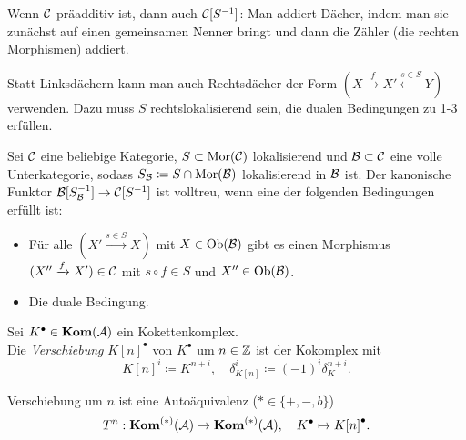 \documentclass{cheat-sheet}
\newcommand{\CCC}[1]{{#1}^{\bullet}} %
\begin{document}
\begin{bem}
  Wenn $\mathcal{C}$ präadditiv ist, dann auch $\mathcal{C}[S^{-1}]$: Man addiert Dächer, indem man sie zunächst auf einen gemeinsamen Nenner bringt und dann die Zähler (die rechten Morphismen) addiert.
\end{bem}

\begin{bem}
  Statt Linksdächern kann man auch Rechtsdächer der Form $(X \xrightarrow{f} X' \xleftarrow{s \in S} Y)$ verwenden. Dazu muss $S$ rechtslokalisierend sein, \dh{} die dualen Bedingungen zu 1-3 erfüllen.
\end{bem}

\begin{prop}
  Sei $\mathcal{C}$ eine beliebige Kategorie, $S \subset \operatorname{Mor}(\mathcal{C})$ lokalisierend und $\mathcal{B} \subset \mathcal{C}$ eine volle Unterkategorie, sodass $S_{\mathcal{B}} \coloneqq S \cap \operatorname{Mor}(\mathcal{B})$ lokalisierend in $\mathcal{B}$ ist.
  Der kanonische Funktor $\mathcal{B}[S_{\mathcal{B}}^{-1}] \to \mathcal{C}[S^{-1}]$ ist volltreu, wenn eine der folgenden Bedingungen erfüllt ist:
  \begin{itemize}
    \item Für alle $(X' \xrightarrow{s \in S} X)$ mit $X \in \operatorname{Ob}(\mathcal{B})$ gibt es einen Morphismus $(X'' \xrightarrow{f} X') \in \mathcal{C}$ mit $s \circ f \in S$ und $X'' \in \operatorname{Ob}(\mathcal{B})$.
    \item Die duale Bedingung.
  \end{itemize}
\end{prop}




\begin{defn}
  Sei $\CCC{K} \in \Kom(\Aat)$ ein Kokettenkomplex. \\
  Die \emph{Verschiebung} $\CCC{K[n]}$ von $\CCC{K}$ um $n \in \mathbb{Z}$ ist der Kokomplex mit
  \[
    K[n]^i \coloneqq K^{n+i}, \quad
    \delta_{K[n]}^i \coloneqq (-1)^i \delta_K^{n+i}.
  \]
\end{defn}

\begin{bem}
  Verschiebung um $n$ ist eine Autoäquivalenz ($* \in \{ {+}, {-}, b \}$)
  \[
    T^n : \Kom^{(*)}(\Aat) \to \Kom^{(*)}(\Aat), \quad
    \CCC{K} \mapsto \CCC{K[n]}.
  \]
\end{bem}
\end{document}
